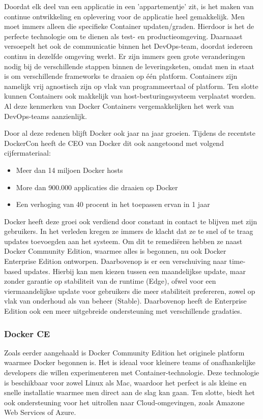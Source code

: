 Doordat elk deel van een applicatie in een 'appartementje' zit, is het maken van continue ontwikkeling en oplevering voor de applicatie heel gemakkelijk. Men moet immers alleen die specifieke Container updaten/graden. Hierdoor is het de perfecte technologie om te dienen als test- en productieomgeving. Daarnaast versoepelt het ook de communicatie binnen het DevOps-team, doordat iedereen continu in dezelfde omgeving werkt. Er zijn immers geen grote veranderingen nodig bij de verschillende stappen binnen de leveringsketen, omdat men in staat is om verschillende frameworks te draaien op één platform. Containers zijn namelijk vrij agnostisch zijn op vlak van programmeertaal of platform. Ten slotte kunnen Containers ook makkelijk van host-besturingssysteem verplaatst worden. Al deze kenmerken van Docker Containers vergemakkelijken het werk van DevOps-teams aanzienlijk.

Door al deze redenen blijft Docker ook jaar na jaar groeien. Tijdens de recentste DockerCon heeft de CEO van Docker dit ook aangetoond met volgend cijfermateriaal:
\begin{itemize}[noitemsep]
	\item Meer dan 14 miljoen Docker hosts
	\item More dan 900.000 applicaties die draaien op Docker
	\item Een verhoging van 40 procent in het toepassen ervan in 1 jaar
\end{itemize}

Docker heeft deze groei ook verdiend door constant in contact te blijven met zijn gebruikers. In het verleden kregen ze immers de klacht dat ze te snel of te traag updates toevoegden aan het systeem. Om dit te remediëren hebben ze naast Docker Community Edition, waarmee alles is begonnen, nu ook Docker Enterprise Edition ontworpen. Daarbovenop is er een verschuiving naar time-based updates. Hierbij kan men kiezen tussen een maandelijkse update, maar zonder garantie op stabiliteit van de runtime (Edge), ofwel voor een viermaandelijkse update voor gebruikers die meer stabiliteit prefereren, zowel op vlak van onderhoud als van beheer (Stable). Daarbovenop heeft de Enterprise Edition ook een meer uitgebreide ondersteuning met verschillende gradaties.

\subsubsection{Docker CE}
Zoals eerder aangehaald is Docker Community Edition het originele platform waarmee Docker begonnen is. Het is ideaal voor kleinere teams of onafhankelijke developers die willen experimenteren met Container-technologie. Deze technologie is beschikbaar voor zowel Linux als Mac, waardoor het perfect is als kleine en snelle installatie waarmee men direct aan de slag kan gaan. Ten slotte, biedt het ook ondersteuning voor het uitrollen naar Cloud-omgevingen, zoals Amazone Web Services of Azure. 

